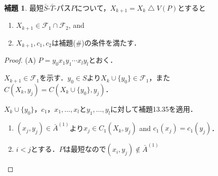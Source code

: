 \documentclass[xelatex,ja=standard,a4paper,14pt,everyparhook=compat]{bxjsarticle}
\newcommand{\mcF}{\mathcal{F}}
\theoremstyle{definition}
\newtheorem*{lemma*}{補題}
\begin{document}
\begin{lemma*}
    最短$\bar S$-$\bar T$-パス$P$について，$X_{k+1} = X_k \mathbin{\bigtriangleup} V(P)$とすると \begin{enumerate}[label=(\Alph*)]
        \item $X_{k+1} \in \mcF_1 \cap \mcF_2$, and
        \item $X_{k+1},c_1,c_2$は補題(\#)の条件を満たす．
    \end{enumerate}
\end{lemma*}
\begin{proof}
    (A) $P = y_0x_1y_1\cdots x_ly_l$とおく．

    $X_{k+1} \in \mcF_1$を示す．$y_0 \in S$より$X_k \cup \{y_0\} \in \mcF_1$，また$C(X_k,y_j) = C(X_k \cup \{y_0\},y_j)$．

    $X_k \cup \{y_0\}$，$c_1$，$x_1,\ldots,x_l$と$y_1,\ldots,y_l$に対して補題13.35を適用． \begin{enumerate}
        \item $(x_j,y_j) \in \bar A^{(1)}$より$x_j \in C_1(X_k,y_j)$ and $c_1(x_j) = c_1(y_j)$．
        \item $i < j$とする．$P$は最短なので$(x_i,y_j) \notin \bar A^{(1)}$
    \end{enumerate}
\end{proof}
\end{document}
